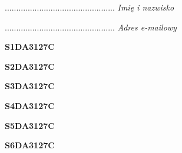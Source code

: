 \begin{turn}{90}\begin{minipage}{\linewidth} \vspace{20mm} ................................................  \textit{Imię i nazwisko}\end{minipage}\end{turn}

\begin{turn}{90}\begin{minipage}{\linewidth} \vspace{20mm} ................................................  \textit{Adres e-mailowy}\end{minipage}\end{turn}

\begin{turn}{90}\huge \begin{minipage}{\linewidth} \vspace{10mm}\textbf{S1DA3127C}\end{minipage}\end{turn}

\begin{turn}{90}\huge \begin{minipage}{\linewidth} \vspace{10mm}\textbf{S2DA3127C}\end{minipage}\end{turn}

\begin{turn}{90}\huge \begin{minipage}{\linewidth} \vspace{10mm}\textbf{S3DA3127C}\end{minipage}\end{turn}

\begin{turn}{90}\huge \begin{minipage}{\linewidth} \vspace{10mm}\textbf{S4DA3127C}\end{minipage}\end{turn}

\begin{turn}{90}\huge \begin{minipage}{\linewidth} \vspace{10mm}\textbf{S5DA3127C}\end{minipage}\end{turn}

\begin{turn}{90}\huge \begin{minipage}{\linewidth} \vspace{10mm}\textbf{S6DA3127C}\end{minipage}\end{turn}

